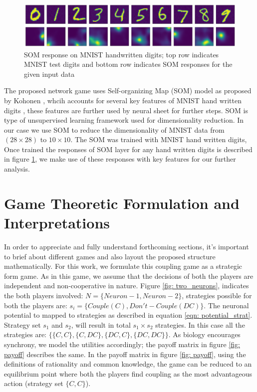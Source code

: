 \documentclass{article}
\begin{document}
\begin{figure}
 \centering
 \includegraphics[width=1.\textwidth]{som_response.png}
 \caption{SOM response on MNIST handwritten digits; top row indicates MNIST test digits and bottom row indicates SOM responses for the given input data}
 \label{fig: som_response}
\end{figure}
The proposed network game uses Self-organizing Map (SOM) model as proposed by Kohonen \cite{}, whcih accounts for several key features of MNIST hand written digits \cite{}, these features are further used by neural sheet for further steps. SOM is type of unsupervised learning framework used for dimensionality reduction. In our case we use SOM to reduce the dimensionality of MNIST data from $(28\times28)$ to $10\times10$. The SOM was trained with MNIST hand written digits, Once trained the responses of SOM layer for any hand written digits is described in figure \ref{fig: som_response}, we make use of these responses with key features for our further analysis.

\section{Game Theoretic Formulation and Interpretations}
\label{gameforintep}

In order to appreciate and fully understand forthcoming sections, it's important to brief about different games and also layout the proposed structure mathematically. For this work, we formulate this coupling game as a strategic form game. As in this game, we assume that the decisions of both the players are independent and non-cooperative in nature. Figure \ref{fig: two_neurons}, indicates the both players involved: $N = \{Neuron-1, Neuron-2\}$, strategies possible for both the players are: $s_i = \{Couple(C), Don't-Couple(DC)\}$. The neuronal potential to mapped to strategies as described in equation \ref{eqn: potential_strat}. Strategy set ${s_1}$ and ${s_2}$, will result in total $s_1 \times s_2$ strategies. In this case all the strategies are: $\{\{C, C\}, \{C, DC\}, \{DC, C\}, \{DC, DC\}\}$. As biology encourages synchrony, we model the utilities accordingly; the payoff matrix in figure \ref{fig: payoff} describes the same.
In the payoff matrix in figure \ref{fig: payoff}, using the definitions of rationality and common knowledge, the game can be reduced to an equilibrium point where both the players find coupling as the most advantageous action (strategy set $\{C, C\}$). 
\end{document}
